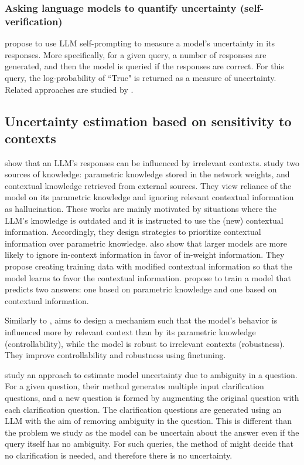 \subsubsection{Asking language models to quantify uncertainty (self-verification)}

\citet{KCAHD2022} propose to use LLM self-prompting to measure a model's uncertainty in its responses. More specifically, for a given query, a number of responses are generated, and then the model is queried if the responses are correct. For this query, the log-probability of ``True" is returned as a measure of uncertainty. Related approaches are studied by \citet{mielke2022reducing}. 



\subsection{Uncertainty estimation based on sensitivity to contexts}

\citet{KS-2020,Zhao-2021} show that an LLM's responses can be influenced by irrelevant contexts. \citet{LPCRDS-2021,neeman2022disentqa} study two sources of knowledge: parametric knowledge stored in the network weights, and contextual knowledge retrieved from external sources. They view reliance of the model on its parametric knowledge and ignoring relevant contextual information as hallucination. These works are mainly motivated by situations where the LLM's knowledge is outdated and it is instructed to use the (new) contextual information. Accordingly, they design strategies to prioritize contextual information over parametric knowledge. \citet{LPCRDS-2021} also show that larger models are more likely to ignore in-context information in favor of in-weight information. They propose creating training data with modified contextual information so that the model learns to favor the contextual information. \citet{neeman2022disentqa} propose to train a model that predicts two answers: one based on parametric knowledge and one based on contextual information. 

Similarly to \citet{neeman2022disentqa}, \citet{LRZWLVYK-2023} aims to design a mechanism such that the model's behavior is influenced more by relevant context than by its parametric knowledge (controllability), while the model is robust to irrelevant contexts (robustness). 
They improve controllability and robustness using finetuning. 

\citet{hou2023decomposing} study an approach to estimate model uncertainty due to ambiguity in a question. 
For a given question, their method generates multiple input clarification questions, and a new question is formed by augmenting the original question with each clarification question. The clarification questions are generated using an LLM with the aim of removing ambiguity in the question. 
This is different than the problem we study as the model can be uncertain about the answer even if the query itself has no ambiguity. 
For such queries, the method of \citet{hou2023decomposing} might decide that no clarification is needed, and therefore there is no uncertainty. 


